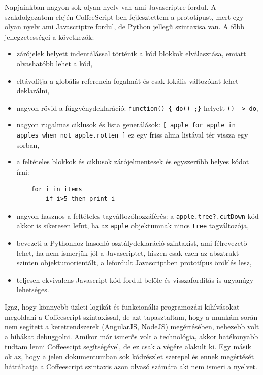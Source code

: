 Napjainkban nagyon sok olyan nyelv van ami Javascriptre fordul\cite{coffeeref}. A szakdolgozatom elején CoffeeScript-ben fejlesztettem a prototípust, mert egy olyan nyelv ami Javascriptre fordul, de Python jellegű szintaxisa van. A főbb jellegzetességei a következők\cite{maccaw2011}:

\begin{itemize}
\item zárójelek helyett indentálással történik a kód blokkok elválasztása, emiatt olvashatóbb lehet a kód,
\item eltávolítja a globális referencia fogalmát és csak lokális változókat lehet deklarálni,
\item nagyon rövid a függvénydeklaráció: \lstinline|function() { do() ;}| helyett \lstinline{() -> do},
\item nagyon rugalmas ciklusok és lista generálások: \lstinline{[ apple for apple in apples when not apple.rotten ]} ez egy friss alma listával tér vissza egy sorban, 
\item a feltételes blokkok és ciklusok zárójelmentesek és egyszerűbb helyes kódot írni: \begin{lstlisting}
    for i in items
        if i>5 then print i
        \end{lstlisting}
\item nagyon hasznos a feltételes tagváltozóhozzáférés: a \lstinline{apple.tree?.cutDown} kód akkor is sikeresen lefut, ha az \lstinline{apple} objektumnak nincs \lstinline{tree} tagváltozója,
\item bevezeti a Pythonhoz hasonló osztálydeklaráció szintaxist, ami félrevezető lehet, ha nem ismerjük jól a Javascriptet, hiszen csak ezen az absztrakt szinten objektumorientált, a lefordult Javascriptben prototípus öröklés lesz,
\item teljesen ekvivalens Javascript kód fordul belőle és visszafordítás is ugyanúgy lehetséges.
\end{itemize}

Igaz, hogy könnyebb üzleti logikát és funkcionális programozási kihívásokat megoldani a Coffeescript szintaxissal, de azt tapasztaltam, hogy a munkám során nem segített a keretrendszerek (AngularJS, NodeJS) megértésében, nehezebb volt a hibákat debuggolni. Amikor már ismerős volt a technológia, akkor hatékonyabb tudtam lenni Coffeescipt segítségével, de ez csak a végére alakult ki. Egy másik ok az, hogy a jelen dokumentumban sok kódrészlet szerepel és ennek megértését hátráltatja a Coffeescript szintaxis azon olvasó számára aki nem ismeri a nyelvet. 

